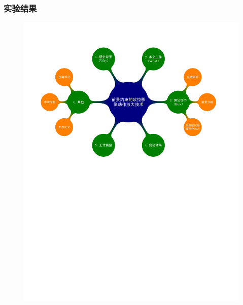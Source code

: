 \documentclass[xcolor=svgnames,serif,table]{beamer}
\begin{document}
\begin{frame}
  \frametitle{实验结果}
  \vspace{-2.5em}
  \begin{figure}
    \centering
    \includegraphics[width=\textwidth, page=8]{mindmap.pdf}
  \end{figure}
\end{frame}
\end{document}
